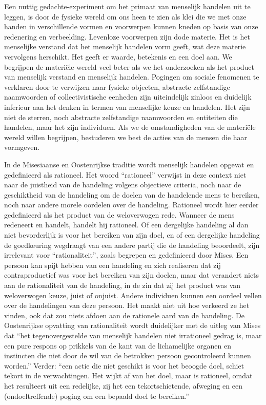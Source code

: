 Een nuttig gedachte-experiment om het primaat van menselijk handelen uit te leggen, is door de fysieke wereld om ons heen te zien als klei die we met onze handen in verschillende vormen en voorwerpen kunnen kneden op basis van onze redenering en verbeelding. Levenloze voorwerpen zijn dode materie. Het is het menselijke verstand dat het menselijk handelen vorm geeft, wat deze materie vervolgens herschikt. Het geeft er waarde, betekenis en een doel aan. We begrijpen de materiële wereld veel beter als we het onderzoeken als het product van menselijk verstand en menselijk handelen. Pogingen om sociale fenomenen te verklaren door te verwijzen naar fysieke objecten, abstracte zelfstandige naamwoorden of collectivistische eenheden zijn uiteindelijk zinloos en duidelijk inferieur aan het denken in termen van menselijke keuze en handelen. Het zijn niet de sterren, noch abstracte zelfstandige naamwoorden en entiteiten die handelen, maar het zijn individuen. Als we de omstandigheden van de materiële wereld willen begrijpen, bestuderen we best de acties van de mensen die haar vormgeven.

In de Misesiaanse en Oostenrijkse traditie wordt menselijk handelen opgevat en gedefinieerd als rationeel. Het woord “rationeel” verwijst in deze context niet naar de juistheid van de handeling volgens objectieve criteria, noch naar de geschiktheid van de handeling om de doelen van de handelende mens te bereiken, noch naar andere morele oordelen over de handeling. Rationeel wordt hier eerder gedefinieerd als het product van de weloverwogen rede. Wanneer de mens redeneert en handelt, handelt hij rationeel. Of een dergelijke handeling al dan niet bevorderlijk is voor het bereiken van zijn doel, en of een dergelijke handeling de goedkeuring wegdraagt van een andere partij die de handeling beoordeelt, zijn irrelevant voor \enquote{rationaliteit}, zoals begrepen en gedefinieerd door Mises. Een persoon kan spijt hebben van een handeling en zich realiseren dat zij contraproductief was voor het bereiken van zijn doelen, maar dat verandert niets aan de rationaliteit van de handeling, in de zin dat zij het product was van weloverwogen keuze, juist of onjuist. Andere individuen kunnen een oordeel vellen over de handelingen van deze persoon. Het maakt niet uit hoe verkeerd ze het vinden, ook dat zou niets afdoen aan de rationele aard van de handeling. De Oostenrijkse opvatting van rationaliteit wordt duidelijker met de uitleg van Mises dat \enquote{het tegenovergestelde van menselijk handelen niet irrationeel gedrag is, maar een pure respons op prikkels van de kant van de lichamelijke organen en instincten die niet door de wil van de betrokken persoon gecontroleerd kunnen worden.} Verder: \enquote{een actie die niet geschikt is voor het beoogde doel, schiet tekort in de verwachtingen. Het wijkt af van het doel, maar is rationeel, omdat het resulteert uit een redelijke, zij het een tekortschietende, afweging en een (ondoeltreffende) poging om een bepaald doel te bereiken.}\autocite{6}

